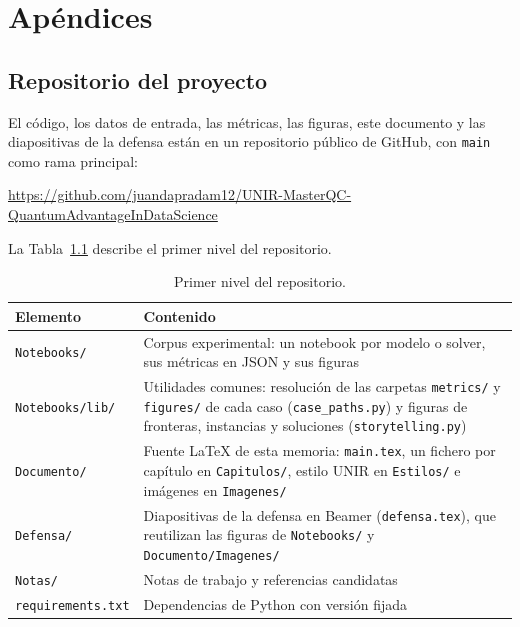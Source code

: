 \chapter{Apéndices}
\renewcommand{\thefigure}{\thechapter.\arabic{figure}}
\renewcommand{\thetable}{\thechapter.\arabic{table}}

\section{Repositorio del proyecto}
\label{anx:repo}

El código, los datos de entrada, las métricas, las figuras, este documento y las diapositivas de la defensa están en un repositorio público de GitHub, con \texttt{main} como rama principal:

\begin{center}
\url{https://github.com/juandapradam12/UNIR-MasterQC-QuantumAdvantageInDataScience}
\end{center}

\noindent La Tabla~\ref{tab:repo} describe el primer nivel del repositorio.

\begin{table}[!htbp]
\centering
\footnotesize
\setlength{\tabcolsep}{4pt}
\renewcommand{\arraystretch}{1.15}
\begin{tabularx}{\linewidth}{@{}>{\raggedright\arraybackslash}p{3.4cm} >{\raggedright\arraybackslash}X@{}}
\toprule
\textbf{Elemento} & \textbf{Contenido} \\
\midrule
\texttt{Notebooks/} & Corpus experimental: un notebook por modelo o solver, sus métricas en JSON y sus figuras \\
\texttt{Notebooks/lib/} & Utilidades comunes: resolución de las carpetas \texttt{metrics/} y \texttt{figures/} de cada caso (\texttt{case\_paths.py}) y figuras de fronteras, instancias y soluciones (\texttt{storytelling.py}) \\
\texttt{Documento/} & Fuente LaTeX de esta memoria: \texttt{main.tex}, un fichero por capítulo en \texttt{Capitulos/}, estilo UNIR en \texttt{Estilos/} e imágenes en \texttt{Imagenes/} \\
\texttt{Defensa/} & Diapositivas de la defensa en Beamer (\texttt{defensa.tex}), que reutilizan las figuras de \texttt{Notebooks/} y \texttt{Documento/Imagenes/} \\
\texttt{Notas/} & Notas de trabajo y referencias candidatas \\
\texttt{requirements.txt} & Dependencias de Python con versión fijada \\
\bottomrule
\end{tabularx}
\caption{Primer nivel del repositorio.}
\label{tab:repo}
\end{table}

